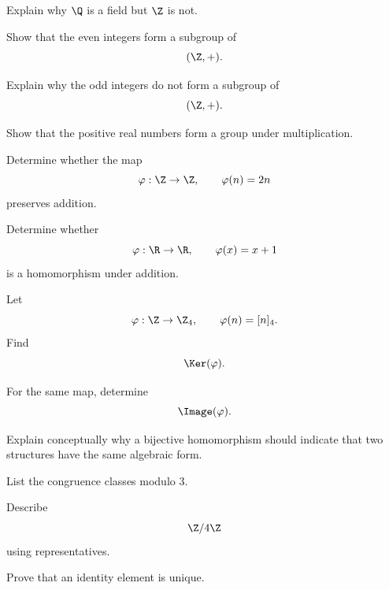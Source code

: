 \begin{exercise}[1]
Explain why \(\Q\) is a field but \(\Z\) is not.
\end{exercise}

\begin{exercise}[2]
Show that the even integers form a subgroup of
\[ (\Z,+). \]
\end{exercise}

\begin{exercise}[2]
Explain why the odd integers do not form a subgroup of
\[ (\Z,+). \]
\end{exercise}

\begin{exercise}[2]
Show that the positive real numbers form a group under multiplication.
\end{exercise}

\begin{exercise}[2]
Determine whether the map
\[ \varphi:\Z\to\Z,\qquad \varphi(n)=2n \]
preserves addition.
\end{exercise}

\begin{exercise}[2]
Determine whether
\[ \varphi:\R\to\R,\qquad \varphi(x)=x+1 \]
is a homomorphism under addition.
\end{exercise}

\begin{exercise}[2]
Let
\[ \varphi:\Z\to\Z_4,\qquad \varphi(n)=[n]_4. \]
Find
\[ \Ker(\varphi). \]
\end{exercise}

\begin{exercise}[2]
For the same map, determine
\[ \Image(\varphi). \]
\end{exercise}

\begin{exercise}[2]
Explain conceptually why a bijective homomorphism should indicate that two
structures have the same algebraic form.
\end{exercise}

\begin{exercise}[2]
List the congruence classes modulo \(3\).
\end{exercise}

\begin{exercise}[2]
Describe
\[ \Z/4\Z \]
using representatives.
\end{exercise}

\begin{exercise}[3]
Prove that an identity element is unique.
\end{exercise}

